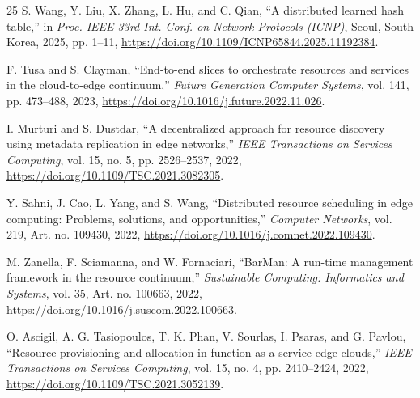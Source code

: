 \documentclass[10pt,twocolumn]{article}
\newcommand{\doi}[1]{\url{https://doi.org/#1}}
\begin{document}
\begin{thebibliography}{25}
 S. Wang, Y. Liu, X. Zhang, L. Hu, and C. Qian, ``A distributed learned hash table,'' in \emph{Proc. IEEE 33rd Int. Conf. on Network Protocols (ICNP)}, Seoul, South Korea, 2025, pp. 1--11, \doi{10.1109/ICNP65844.2025.11192384}.
	
 F. Tusa and S. Clayman, ``End-to-end slices to orchestrate resources and services in the cloud-to-edge continuum,'' \emph{Future Generation Computer Systems}, vol. 141, pp. 473--488, 2023, \doi{10.1016/j.future.2022.11.026}.
	
 I. Murturi and S. Dustdar, ``A decentralized approach for resource discovery using metadata replication in edge networks,'' \emph{IEEE Transactions on Services Computing}, vol. 15, no. 5, pp. 2526--2537, 2022, \doi{10.1109/TSC.2021.3082305}.
	
 Y. Sahni, J. Cao, L. Yang, and S. Wang, ``Distributed resource scheduling in edge computing: Problems, solutions, and opportunities,'' \emph{Computer Networks}, vol. 219, Art. no. 109430, 2022, \doi{10.1016/j.comnet.2022.109430}.
	
 M. Zanella, F. Sciamanna, and W. Fornaciari, ``BarMan: A run-time management framework in the resource continuum,'' \emph{Sustainable Computing: Informatics and Systems}, vol. 35, Art. no. 100663, 2022, \doi{10.1016/j.suscom.2022.100663}.
	
 O. Ascigil, A. G. Tasiopoulos, T. K. Phan, V. Sourlas, I. Psaras, and G. Pavlou, ``Resource provisioning and allocation in function-as-a-service edge-clouds,'' \emph{IEEE Transactions on Services Computing}, vol. 15, no. 4, pp. 2410--2424, 2022, \doi{10.1109/TSC.2021.3052139}.
	
\end{thebibliography}
\end{document}
